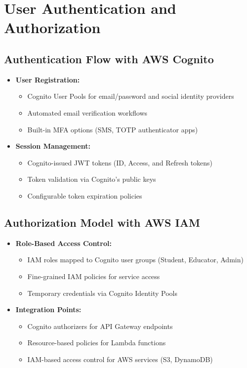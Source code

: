 \documentclass[a4paper, 11pt]{scrreprt}
\begin{document}
\section{User Authentication and Authorization}
\subsection{Authentication Flow with AWS Cognito}
\begin{itemize}
    \item \textbf{User Registration:}
    \begin{itemize}
        \item Cognito User Pools for email/password and social identity providers
        \item Automated email verification workflows
        \item Built-in MFA options (SMS, TOTP authenticator apps)
    \end{itemize}
    
    \item \textbf{Session Management:}
    \begin{itemize}
        \item Cognito-issued JWT tokens (ID, Access, and Refresh tokens)
        \item Token validation via Cognito's public keys
        \item Configurable token expiration policies
    \end{itemize}
\end{itemize}

\subsection{Authorization Model with AWS IAM}
\begin{itemize}
    \item \textbf{Role-Based Access Control:}
    \begin{itemize}
        \item IAM roles mapped to Cognito user groups (Student, Educator, Admin)
        \item Fine-grained IAM policies for service access
        \item Temporary credentials via Cognito Identity Pools
    \end{itemize}
    
    \item \textbf{Integration Points:}
    \begin{itemize}
        \item Cognito authorizers for API Gateway endpoints
        \item Resource-based policies for Lambda functions
        \item IAM-based access control for AWS services (S3, DynamoDB)
    \end{itemize}
\end{itemize}
\end{document}
